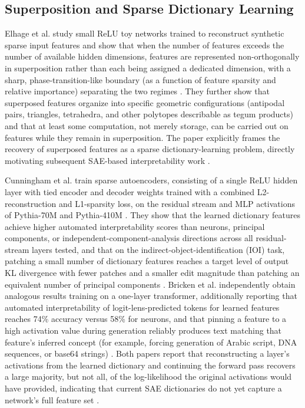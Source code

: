 \documentclass[conference]{IEEEtran}
\begin{document}
\subsection{Superposition and Sparse Dictionary Learning}

Elhage et al. study small ReLU toy networks trained to reconstruct synthetic sparse input features and show that when the number of features exceeds the number of available hidden dimensions, features are represented non-orthogonally in superposition rather than each being assigned a dedicated dimension, with a sharp, phase-transition-like boundary (as a function of feature sparsity and relative importance) separating the two regimes \cite{elhage2022superposition}. They further show that superposed features organize into specific geometric configurations (antipodal pairs, triangles, tetrahedra, and other polytopes describable as tegum products) and that at least some computation, not merely storage, can be carried out on features while they remain in superposition. The paper explicitly frames the recovery of superposed features as a sparse dictionary-learning problem, directly motivating subsequent SAE-based interpretability work \cite{elhage2022superposition}.

Cunningham et al. train sparse autoencoders, consisting of a single ReLU hidden layer with tied encoder and decoder weights trained with a combined L2-reconstruction and L1-sparsity loss, on the residual stream and MLP activations of Pythia-70M and Pythia-410M \cite{cunningham2023sparse}. They show that the learned dictionary features achieve higher automated interpretability scores than neurons, principal components, or independent-component-analysis directions across all residual-stream layers tested, and that on the indirect-object-identification (IOI) task, patching a small number of dictionary features reaches a target level of output KL divergence with fewer patches and a smaller edit magnitude than patching an equivalent number of principal components \cite{cunningham2023sparse}. Bricken et al. independently obtain analogous results training on a one-layer transformer, additionally reporting that automated interpretability of logit-lens-predicted tokens for learned features reaches 74\% accuracy versus 58\% for neurons, and that pinning a feature to a high activation value during generation reliably produces text matching that feature's inferred concept (for example, forcing generation of Arabic script, DNA sequences, or base64 strings) \cite{bricken2023towards}. Both papers report that reconstructing a layer's activations from the learned dictionary and continuing the forward pass recovers a large majority, but not all, of the log-likelihood the original activations would have provided, indicating that current SAE dictionaries do not yet capture a network's full feature set \cite{cunningham2023sparse, bricken2023towards}.
\end{document}
